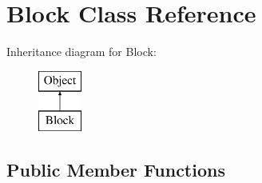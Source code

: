 \hypertarget{class_block}{}\section{Block Class Reference}
\label{class_block}
Inheritance diagram for Block\+:\begin{figure}[H]
\begin{center}
\leavevmode
\includegraphics[height=2.000000cm]{class_block}
\end{center}
\end{figure}
\subsection*{Public Member Functions}
